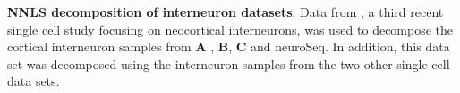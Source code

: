 \textbf{NNLS decomposition of interneuron datasets}. Data from \citep{Paul_2017}, a third recent single cell study focusing on neocortical interneurons, was used to decompose the cortical interneuron samples from \textbf{A} \citep{Tasic_2018}, \textbf{B}\citep{Zeisel_2018}, \textbf{C} and neuroSeq. In addition, this data set was decomposed using the interneuron samples from the two other single cell data sets.